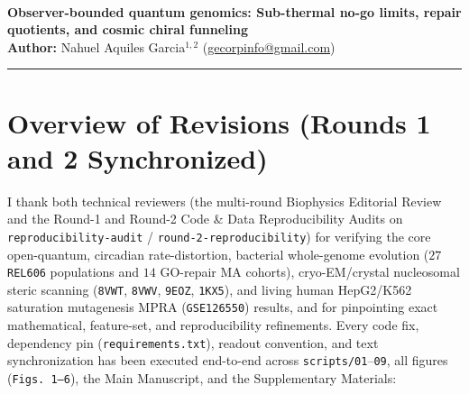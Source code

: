 \documentclass[10pt,letterpaper]{article}
\begin{document}
\thispagestyle{plain}

\\[0.5em]
{\Large\textbf{Observer-bounded quantum genomics: Sub-thermal no-go limits, repair quotients, and cosmic chiral funneling}}\\[0.4em]
{\normalsize\textbf{Author:} Nahuel Aquiles Garcia$^{1,2}$ (\href{mailto:gecorpinfo@gmail.com}{gecorpinfo@gmail.com})}\\[0.4em]
\noindent\rule{\textwidth}{0.6pt}

\section*{Overview of Revisions (Rounds 1 and 2 Synchronized)}

I thank both technical reviewers (the multi-round Biophysics Editorial Review and the Round-1 and Round-2 Code \& Data Reproducibility Audits on \texttt{reproducibility-audit} / \texttt{round-2-reproducibility}) for verifying the core open-quantum, circadian rate-distortion, bacterial whole-genome evolution ($27$ \texttt{REL606} populations and $14$ GO-repair MA cohorts), cryo-EM/crystal nucleosomal steric scanning (\texttt{8VWT}, \texttt{8VWV}, \texttt{9EOZ}, \texttt{1KX5}), and living human HepG2/K562 saturation mutagenesis MPRA (\texttt{GSE126550}) results, and for pinpointing exact mathematical, feature-set, and reproducibility refinements. Every code fix, dependency pin (\texttt{requirements.txt}), readout convention, and text synchronization has been executed end-to-end across \texttt{scripts/01}--\texttt{09}, all figures (\texttt{Figs.\ 1--6}), the Main Manuscript, and the Supplementary Materials:
\end{document}
